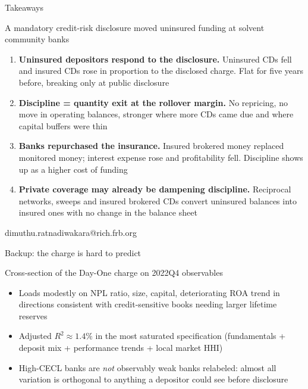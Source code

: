 \documentclass[aspectratio=169,10pt]{beamer}
\newcommand{\spec}[1]{{\vspace{-2mm}\textcolor{pgray}{\footnotesize #1}\par\vspace{1mm}}}
\newcommand{\pill}[2]{\hyperlink{#1}{\beamergotobutton{#2}}}
\begin{document}
\begin{frame}{Takeaways}
  \spec{A mandatory credit-risk disclosure moved uninsured funding at solvent community banks}
  \begin{enumerate}
    \item<1-> \textbf{Uninsured depositors respond to the disclosure.} Uninsured CDs fell
      and insured CDs rose in proportion to the disclosed charge. Flat for
      five years before, breaking only at public disclosure
    \item<1-> \textbf{Discipline = quantity exit at the rollover margin.} No
      repricing, no move in operating balances, stronger where more CDs came
      due and where capital buffers were thin
    \item<1-> \textbf{Banks repurchased the insurance.} Insured brokered
      money replaced monitored money; interest expense rose and profitability
      fell. Discipline shows up as a higher cost of funding
    \item<1-> \textbf{Private coverage may already be dampening discipline.}
      Reciprocal networks, sweeps and insured brokered CDs convert uninsured
      balances into insured ones with no change in the balance sheet
  \end{enumerate}
  \vfill
  \begin{center}
    \textcolor{pgray}{\small dimuthu.ratnadiwakara@rich.frb.org}
  \end{center}
\end{frame}

\appendix

\begin{frame}[label=apppredictors]{Backup: the charge is hard to predict}
  \spec{Cross-section of the Day-One charge on 2022Q4 observables}
  \begin{itemize}
    \item Loads modestly on NPL ratio, size, capital, deteriorating ROA trend
      in directions consistent with credit-sensitive books needing larger
      lifetime reserves
    \item Adjusted $R^2 \approx 1.4\%$ in the most saturated specification
      (fundamentals + deposit mix + performance trends + local market HHI)
    \item High-CECL banks are \emph{not} observably weak banks relabeled:
      almost all variation is orthogonal to anything a depositor could see
      before disclosure
  \end{itemize}
  \hfill \pill{ftreat}{back}
\end{frame}
\end{document}
